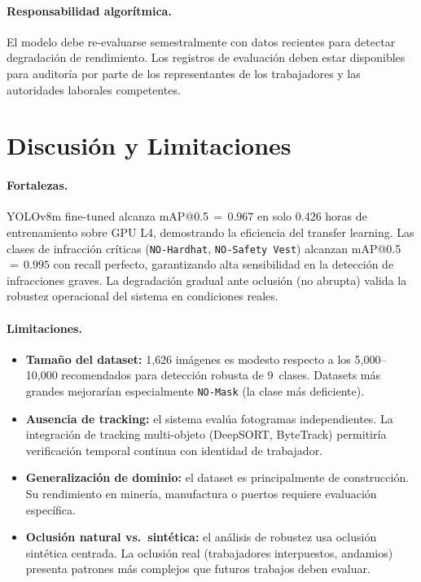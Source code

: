 \documentclass{article}
\begin{document}
\paragraph{Responsabilidad algorítmica.}
El modelo debe re-evaluarse semestralmente con datos recientes para
detectar degradación de rendimiento. Los registros de evaluación deben
estar disponibles para auditoría por parte de los representantes de los
trabajadores y las autoridades laborales competentes.

\section{Discusión y Limitaciones}
\label{sec:discussion}

\paragraph{Fortalezas.}
YOLOv8m fine-tuned alcanza mAP@0.5\,$=\,0.967$ en solo 0.426 horas de
entrenamiento sobre GPU L4, demostrando la eficiencia del transfer
learning. Las clases de infracción críticas (\texttt{NO-Hardhat},
\texttt{NO-Safety Vest}) alcanzan mAP@0.5\,$=\,0.995$ con recall
perfecto, garantizando alta sensibilidad en la detección de infracciones
graves. La degradación gradual ante oclusión (no abrupta) valida la
robustez operacional del sistema en condiciones reales.

\paragraph{Limitaciones.}
\begin{itemize}[itemsep=2pt]
  \item \textbf{Tamaño del dataset:} 1{,}626 imágenes es modesto respecto
        a los 5{,}000--10{,}000 recomendados para detección robusta de
        9~clases. Datasets más grandes mejorarían especialmente
        \texttt{NO-Mask} (la clase más deficiente).
  \item \textbf{Ausencia de tracking:} el sistema evalúa fotogramas
        independientes. La integración de tracking multi-objeto
        (DeepSORT, ByteTrack) permitiría verificación temporal
        continua con identidad de trabajador.
  \item \textbf{Generalización de dominio:} el dataset es principalmente
        de construcción. Su rendimiento en minería, manufactura o
        puertos requiere evaluación específica.
  \item \textbf{Oclusión natural vs.\ sintética:} el análisis de
        robustez usa oclusión sintética centrada. La oclusión real
        (trabajadores interpuestos, andamios) presenta patrones más
        complejos que futuros trabajos deben evaluar.
\end{itemize}
\end{document}
